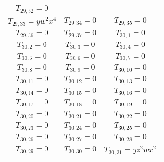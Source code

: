 \documentclass[12pt]{memoireuqam1.3}
\begin{document}
\begin{longtable}{|c|c|c|}
$T_{29,32}= 0$\\

$T_{29,33}= yw^2x^4$&

$T_{29,34}= 0$&

$T_{29,35}= 0$\\

$T_{29,36}= 0$&

$T_{29,37}= 0$&

$T_{30,1}= 0$\\

$T_{30,2}= 0$&

$T_{30,3}= 0$&

$T_{30,4}= 0$\\

$T_{30,5}= 0$&

$T_{30,6}= 0$&

$T_{30,7}= 0$\\

$T_{30,8}= 0$&

$T_{30,9}= 0$&

$T_{30,10}= 0$\\

$T_{30,11}= 0$&

$T_{30,12}= 0$&

$T_{30,13}= 0$\\

$T_{30,14}= 0$&

$T_{30,15}= 0$&

$T_{30,16}= 0$\\

$T_{30,17}= 0$&

$T_{30,18}= 0$&

$T_{30,19}= 0$\\

$T_{30,20}= 0$&

$T_{30,21}= 0$&

$T_{30,22}= 0$\\

$T_{30,23}= 0$&

$T_{30,24}= 0$&

$T_{30,25}= 0$\\

$T_{30,26}= 0$&

$T_{30,27}= 0$&

$T_{30,28}= 0$\\

$T_{30,29}= 0$&

$T_{30,30}= 0$&

$T_{30,31}= yz^2wx^2$\\


\end{longtable}
\end{document}
